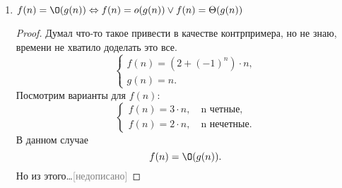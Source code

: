 \begin{enumerate}
\begin{enumerate}
\begin{proof}
      \end{proof}
      \item $f(n) = \O(g(n)) \Leftrightarrow f(n) = o(g(n)) \lor f(n) = \Theta(g(n))$
      \begin{proof}
        Думал что-то такое привести в качестве контрпримера, но не знаю, времени не хватило доделать это все.
        \begin{equation}
          \begin{cases}
            f(n) = (2 + (-1)^n)\cdot n, \\
            g(n) = n.
          \end{cases}
        \end{equation}
        Посмотрим варианты для $f(n)$:
        \begin{equation}
          \begin{cases}
            f(n) = 3\cdot n, \quad \text{n четные}, \\
            f(n) = 2\cdot n, \quad \text{n нечетные}.
          \end{cases} 
        \end{equation}
        В данном случае
        \begin{equation}
          f(n) = \O(g(n)).
        \end{equation}
        Но из этого\dots\textcolor{gray}{[недописано]}

\end{proof}
\end{enumerate}
\end{enumerate}
